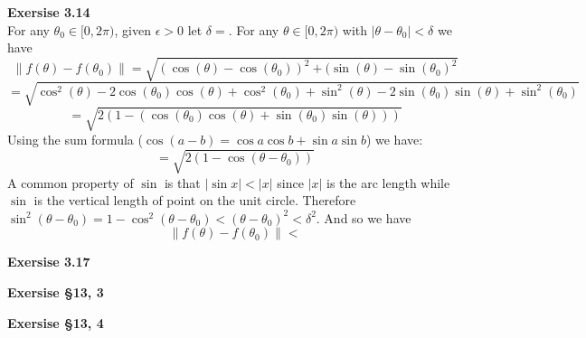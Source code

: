 \documentclass[12pt]{article}
\newenvironment{ques}[1]{\textbf{Exersise #1}\vspace{1 mm}\\ }{\bigskip}
\theoremstyle{definition}
\begin{document}
\begin{ques}{3.14}
	For any $\theta_0 \in [0,2\pi)$, given $\epsilon > 0$ let $\delta = $.
	For any $\theta \in [0,2\pi)$ with $|\theta - \theta_0| < \delta$ we
	have 
	$$\lVert f(\theta) - f(\theta_0) \rVert = \sqrt{(\cos(\theta) -
	\cos(\theta_0))^2 + (\sin(\theta) - \sin(\theta_0)^2}$$
	$$= \sqrt{\cos^2(\theta) - 2\cos(\theta_0)\cos(\theta) +
	\cos^2(\theta_0) +\sin^2(\theta) - 2\sin(\theta_0)\sin(\theta) +
	\sin^2(\theta_0)}$$
	$$= \sqrt{2(1 - (\cos(\theta_0)\cos(\theta) + \sin(\theta_0)\sin(\theta)))}$$
	Using the sum formula ($\cos(a - b) = \cos a\cos b + \sin a \sin b$) we have:
	$$= \sqrt{2(1 - \cos(\theta - \theta_0))}$$
	A common property of $\sin$ is that $|\sin x| < |x|$ since $|x|$ is the arc
	length while $\sin$ is the vertical length of point on the unit circle.
	Therefore $\sin^2 (\theta - \theta_0) = 1 - \cos^2 (\theta - \theta_0)
	< (\theta - \theta_0)^2 < \delta^2$. And so we have
	$$\lVert f(\theta) - f(\theta_0) \rVert < $$ 
	
\end{ques}

\begin{ques}{3.17}
\end{ques}

\begin{ques}{\S 13, 3}

\end{ques}

\begin{ques}{\S 13, 4}
\end{ques}
\end{document}
